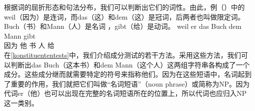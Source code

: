 根据词的屈折形态和句法分布，我们可以判断出它们的词性。由此，例（）中的weil（因为）是连词，而das（这）和dem（这）是冠词，后两者也叫做限定词。Buch（书）和Mann（人）是名词 ，gibt（给）是动词。
\ea\label{bsp-weil-er-das-buch-dem-mann-gibt}
\gll weil er das Buch dem Mann gibt\\
	 因为 他  书  人 给\\
\z
在\ref{konstituententests}中，我们介绍成分测试的若干方法。采用这些方法，我们可以判断出das Buch（这本书）和dem Mann（这个人）这两组字符串各构成了一个成分。这些成分继而就需要特定的符号来指称他们。因为在这些短语中，名词起到了重要的作用，我们就把它们叫做“名词短语”（noun phrase）或简称为NP。因为代词er（他）也可以出现在完整的名词短语所在的位置上，所以代词也应归入NP这一类别。


